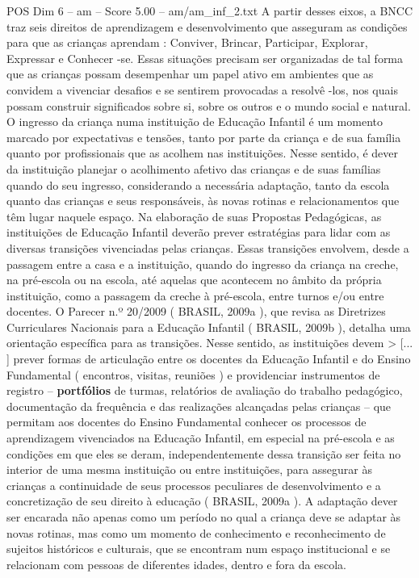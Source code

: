 \begin{textsample}{POS Dim 6 – am – Score 5.00 – am/am\_inf\_2.txt}
A partir desses eixos, a BNCC traz seis direitos de aprendizagem e desenvolvimento que asseguram as condições para que as crianças aprendam : Conviver, Brincar, Participar, Explorar, Expressar e Conhecer -se.
Essas situações precisam ser organizadas de tal forma que as crianças possam desempenhar um papel ativo em ambientes que as convidem a vivenciar desafios e se sentirem provocadas a resolvê -los, nos quais possam construir significados sobre si, sobre os outros e o mundo social e natural.
O ingresso da criança numa instituição de Educação Infantil é um momento marcado por expectativas e tensões, tanto por parte da criança e de sua família quanto por profissionais que as acolhem nas instituições.
Nesse sentido, é dever da instituição planejar o acolhimento afetivo das crianças e de suas famílias quando do seu ingresso, considerando a necessária adaptação, tanto da escola quanto das crianças e seus responsáveis, às novas rotinas e relacionamentos que têm lugar naquele espaço.
Na elaboração de suas Propostas Pedagógicas, as instituições de Educação Infantil deverão prever estratégias para lidar com as diversas transições vivenciadas pelas crianças.
Essas transições envolvem, desde a passagem entre a casa e a instituição, quando do ingresso da criança na creche, na pré-escola ou na escola, até aquelas que acontecem no âmbito da própria instituição, como a passagem da creche à pré-escola, entre turnos e/ou entre docentes.
O Parecer n.º 20/2009 ( BRASIL, 2009a ), que revisa as Diretrizes Curriculares Nacionais para a Educação Infantil ( BRASIL, 2009b ), detalha uma orientação específica para as transições.
Nesse sentido, as instituições devem > [... ] prever formas de articulação entre os docentes da Educação Infantil e do Ensino Fundamental ( encontros, visitas, reuniões ) e providenciar instrumentos de registro – \textbf{portfólios} de turmas, relatórios de avaliação do trabalho pedagógico, documentação da frequência e das realizações alcançadas pelas crianças – que permitam aos docentes do Ensino Fundamental conhecer os processos de aprendizagem vivenciados na Educação Infantil, em especial na pré-escola e as condições em que eles se deram, independentemente dessa transição ser feita no interior de uma mesma instituição ou entre instituições, para assegurar às crianças a continuidade de seus processos peculiares de desenvolvimento e a concretização de seu direito à educação ( BRASIL, 2009a ).
A adaptação dever ser encarada não apenas como um período no qual a criança deve se adaptar às novas rotinas, mas como um momento de conhecimento e reconhecimento de sujeitos históricos e culturais, que se encontram num espaço institucional e se relacionam com pessoas de diferentes idades, dentro e fora da escola.

\end{textsample}

